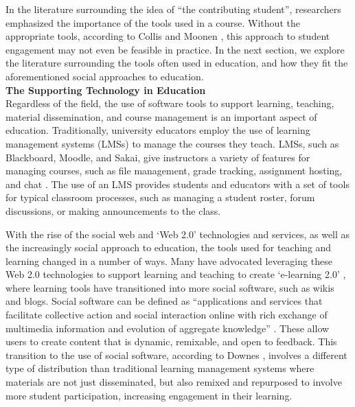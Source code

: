 In the literature surrounding the idea of ``the contributing student'', researchers emphasized the importance of the tools used in a course. Without the appropriate tools, according to Collis and Moonen \cite{collis2006contributing}, this approach to student engagement may not even be feasible in practice. In the next section, we explore the literature surrounding the tools often used in education, and how they fit the aforementioned social approaches to education. \\

\textbf{The Supporting Technology in Education} \\
Regardless of the field, the use of software tools to support learning, teaching, material dissemination, and course management is an important aspect of education. Traditionally, university educators employ the use of learning management systems (LMSs) to manage the courses they teach. LMSs, such as Blackboard, Moodle, and Sakai, give instructors a variety of features for managing courses, such as file management, grade tracking, assignment hosting, and chat \cite{kumar2011comparative}. The use of an LMS provides students and educators with a set of tools for typical classroom processes, such as managing a student roster, forum discussions, or making announcements to the class.

With the rise of the social web and `Web 2.0' technologies and services, as well as the increasingly social approach to education, the tools used for teaching and learning changed in a number of ways. Many have advocated leveraging these Web 2.0 technologies to support learning and teaching to create `e-learning 2.0' \cite{downes2005feature}, where learning tools have transitioned into more social software, such as wikis and blogs. Social software can be defined as ``applications and services that facilitate collective action and social interaction online with rich exchange of multimedia information and evolution of aggregate knowledge'' \cite{parameswaran2007social}. These allow users to create content that is dynamic, remixable, and open to feedback. This transition to the use of social software, according to Downes \cite{downes2005feature}, involves a different type of distribution than traditional learning management systems where materials are not just disseminated, but also remixed and repurposed to involve more student participation, increasing engagement in their learning.

